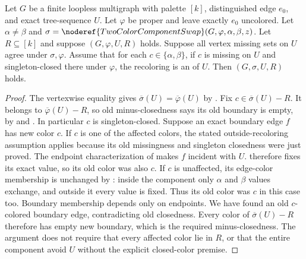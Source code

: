 \begin{helper}
Let $G$ be a finite loopless multigraph with palette $[k]$, distinguished
edge $e_0$, and exact tree-sequence $U$.  Let $\varphi$ be proper and
leave exactly $e_0$ uncolored.  Let $\alpha\ne\beta$ and
$\sigma=\noderef{TwoColorComponentSwap}(G,\varphi,\alpha,\beta,z)$.
Let $R\subseteq[k]$ and suppose
$(G,\varphi,U,R)$ holds.
Suppose all vertex missing sets on $U$ agree under $\sigma,\varphi$.
Assume that for each $c\in\{\alpha,\beta\}$, if $c$ is missing on $U$
and singleton-closed there under $\varphi$, the recoloring is an
 of $U$.
Then $(G,\sigma,U,R)$ holds.
\end{helper}
\begin{proof}
The vertexwise equality gives
$\overline\sigma(U)=\overline\varphi(U)$ by
.
Fix $c\in\overline\sigma(U)-R$.  It belongs to
$\overline\varphi(U)-R$, so old minus-closedness says its old boundary
is empty, by  and
.  In particular $c$ is singleton-closed.
Suppose an exact boundary edge $f$ has new color $c$.
If $c$ is one of the affected colors, the stated outside-recoloring
assumption applies because its old missingness and singleton closedness
were just proved.  The endpoint characterization of
 makes $f$ incident with $U$.
 therefore fixes its exact value,
so its old color was also $c$.
If $c$ is unaffected, its edge-color membership is unchanged by
: inside the component only $\alpha$
and $\beta$ values exchange, and outside it every value is fixed.
Thus its old color was $c$ in this case too.
Boundary membership depends only on endpoints.  We have found an old
$c$-colored boundary edge, contradicting old closedness.
Every color of $\overline\sigma(U)-R$ therefore has empty new boundary,
which is the required minus-closedness.  The argument does not require
that every affected color lie in $R$, or that the entire component avoid
$U$ without the explicit closed-color premise.
\end{proof}

